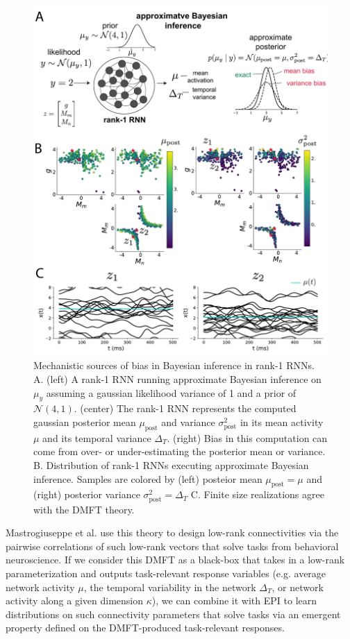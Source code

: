 \documentclass[11pt]{article}
\begin{document}
\begin{figure}
\begin{center}
\includegraphics[scale=0.7]{figures/fig5/fig5.pdf}
\end{center}
\caption{Mechanistic sources of bias in Bayesian inference in rank-1 RNNs.  A. (left) A rank-1 RNN running approximate Bayesian inference on $\mu_y$ assuming a gaussian likelihood variance of 1 and a prior of $\mathcal{N}(4,1)$.  (center) The rank-1 RNN represents the computed gaussian posterior mean $\mu_{\text{post}}$ and variance $\sigma^2_{\text{post}}$  in its mean activity $\mu$ and its temporal variance $\Delta_T$.  (right) Bias in this computation can come from over- or under-estimating the posterior mean or variance. B. Distribution of rank-1 RNNs executing approximate Bayesian inference.  Samples are colored by (left) posteior mean $\mu_{\text{post}}=\mu$ and (right) posterior variance $\sigma^2_{\text{post}}=\Delta_T$  C. Finite size realizations agree with the DMFT theory.}
\end{figure}

Mastrogiuseppe et al. use this theory to design  low-rank connectivities via the pairwise correlations of such low-rank vectors that solve tasks from behavioral neuroscience. If we consider this DMFT as a black-box that takes in a low-rank parameterization and outputs task-relevant response variables (e.g. average network activity $\mu$, the temporal variability in the network $\Delta_T$, or network activity along a given dimension $\kappa$), we can combine it with EPI to learn distributions on such connectivity parameters that solve tasks via an emergent property defined on the DMFT-produced task-relevant responses.
\end{document}
